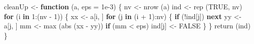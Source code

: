 \documentclass[
  12pt,
  letterpaper,
  DIV=11,
  numbers=noendperiod]{scrreprt}
\newenvironment{Shaded}{\begin{snugshade}}{\end{snugshade}}
\newcommand{\AttributeTok}[1]{\textcolor[rgb]{0.40,0.45,0.13}{#1}}
\newcommand{\ConstantTok}[1]{\textcolor[rgb]{0.56,0.35,0.01}{#1}}
\newcommand{\ControlFlowTok}[1]{\textcolor[rgb]{0.00,0.23,0.31}{\textbf{#1}}}
\newcommand{\DecValTok}[1]{\textcolor[rgb]{0.68,0.00,0.00}{#1}}
\newcommand{\FloatTok}[1]{\textcolor[rgb]{0.68,0.00,0.00}{#1}}
\newcommand{\FunctionTok}[1]{\textcolor[rgb]{0.28,0.35,0.67}{#1}}
\newcommand{\NormalTok}[1]{\textcolor[rgb]{0.00,0.23,0.31}{#1}}
\newcommand{\OtherTok}[1]{\textcolor[rgb]{0.00,0.23,0.31}{#1}}
\newcommand{\SpecialCharTok}[1]{\textcolor[rgb]{0.37,0.37,0.37}{#1}}
\theoremstyle{remark}
\begin{document}
\begin{Shaded}
\begin{Highlighting}[]
\NormalTok{cleanUp }\OtherTok{\textless{}{-}} \ControlFlowTok{function}\NormalTok{ (a, }\AttributeTok{eps =} \FloatTok{1e{-}3}\NormalTok{) \{}
\NormalTok{  nv }\OtherTok{\textless{}{-}} \FunctionTok{nrow}\NormalTok{ (a)}
\NormalTok{  ind }\OtherTok{\textless{}{-}} \FunctionTok{rep}\NormalTok{ (}\ConstantTok{TRUE}\NormalTok{, nv)}
  \ControlFlowTok{for}\NormalTok{ (i }\ControlFlowTok{in} \DecValTok{1}\SpecialCharTok{:}\NormalTok{(nv }\SpecialCharTok{{-}} \DecValTok{1}\NormalTok{)) \{}
\NormalTok{    xx }\OtherTok{\textless{}{-}}\NormalTok{ a[i, ]}
    \ControlFlowTok{for}\NormalTok{ (j }\ControlFlowTok{in}\NormalTok{ (i }\SpecialCharTok{+} \DecValTok{1}\NormalTok{)}\SpecialCharTok{:}\NormalTok{nv) \{}
      \ControlFlowTok{if}\NormalTok{ (}\SpecialCharTok{!}\NormalTok{ind[j])}
        \ControlFlowTok{next}
\NormalTok{      yy }\OtherTok{\textless{}{-}}\NormalTok{ a[j, ]}
\NormalTok{      mm }\OtherTok{\textless{}{-}} \FunctionTok{max}\NormalTok{ (}\FunctionTok{abs}\NormalTok{ (xx }\SpecialCharTok{{-}}\NormalTok{ yy))}
      \ControlFlowTok{if}\NormalTok{ (mm }\SpecialCharTok{\textless{}}\NormalTok{ eps)}
\NormalTok{        ind[j] }\OtherTok{\textless{}{-}} \ConstantTok{FALSE}
\NormalTok{    \}}
\NormalTok{  \}}
  \FunctionTok{return}\NormalTok{ (ind)}
\NormalTok{\}}


\end{Highlighting}
\end{Shaded}
\end{document}
